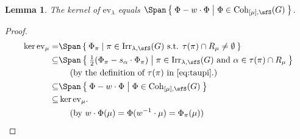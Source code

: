 \documentclass[12pt,a4paper]{amsart}
\numberwithin{equation}{section}
\newtheorem{lem}[thm]{Lemma}
\theoremstyle{remark}
\def\half{{\tfrac{1}{2}}}
\def\Irr{\mathrm{Irr}}
\def\Coh{\mathrm{Coh}}
\def\ev#1{{\mathrm{ev}_{#1}}}
\begin{document}
  \begin{lem}
  The kernel of $\mathrm{ev}_\lambda$ equals $\Span\Set{\Phi- w\cdot \Phi |\Phi\in \Coh_{[\mu],\sfS}(G)} $.
  \end{lem}
  \begin{proof} \[
    \begin{split}
      \ker \ev{\mu} = & \Span \Set{\Phi_{\pi}| \pi\in \Irr_{\lambda, \sfS}(G) \text{
          s.t. }
        \tau(\pi)\cap R_{\mu}\neq \emptyset}\\
      \subseteq & \Span \Set{\half(\Phi_\pi - s_{\alpha}\cdot \Phi_{\pi}) | \pi\in \Irr_{\lambda, \sfS}(G) \text{
          and } \alpha \in
        \tau(\pi)\cap R_{\mu}}\\
      & \ \ \ \  \text{(by the definition of $\tau(\pi)$ in \eqref{eq:taupi}.)} \\
      \subseteq &\Span\Set{\Phi- w\cdot \Phi |\Phi\in \Coh_{[\mu],\sfS}(G)} \\
      \subseteq & \ker \ev{\mu}. \\
      &\ \ \ \ \text{(by
        $w\cdot \Phi(\mu) = \Phi(w^{-1}\cdot \mu)=\Phi_\pi(\mu)$)}
    \end{split}
  \]

\end{proof}
\end{document}
